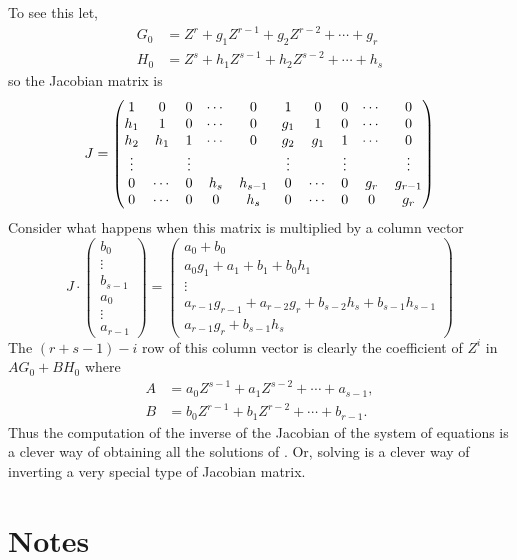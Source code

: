 To see this let,
\[
\begin{aligned}
  G_0 &= Z^r + g_1 Z^{r-1} + g_2 Z^{r-2} + \cdots + g_r\\
  H_0 &=Z^s + h_1 Z^{s-1} + h_2 Z^{s-2} + \cdots + h_s
\end{aligned}
\]
so the Jacobian matrix is
\[
J = 
\begin{pmatrix}
1&0&0& \cdots&0&1&0&0&\cdots&0\\
h_1&1&0& \cdots&0&g_1&1&0&\cdots&0\\
h_2&h_1&1& \cdots&0&g_2&g_1&1&\cdots&0\\
\vdots&\null&\vdots&\null&\null&\vdots&\null&\vdots&\null&\vdots\\
0&\cdots&0&h_s&h_{s-1}&0&\cdots&0&g_r&g_{r-1}\\
0&\cdots&0&0&h_s&0&\cdots&0&0&g_r
\end{pmatrix}
\]
Consider what happens when this matrix is multiplied by a column vector
\[
J\cdot
\begin{pmatrix}
b_0\\ \vdots \\ b_{s-1}\\ a_0\\ \vdots\\ a_{r-1}
\end{pmatrix}
=
\begin{pmatrix}
a_0 +b_0\\
a_0 g_1 + a_1 + b_1 + b_0 h_1\\
\vdots\\
a_{r-1} g_{r-1} + a_{r-2} g_r + b_{s-2} h_{s} + b_{s-1} h_{s-1}\\
a_{r-1} g_{r} + b_{s-1} h_{s}
\end{pmatrix}
\]
The $(r+ s - 1) - i$ row of this column vector is clearly the coefficient
of $Z^i$ in $A G_0 + B H_0$ where
\[
\begin{aligned}
  A &= a_0 Z^{s-1} + a_1 Z^{s-2} + \cdots + a_{s-1},\\
  B &= b_0 Z^{r-1} + b_1 Z^{r-2} + \cdots + b_{r-1}.
\end{aligned}
\]
Thus the computation of the inverse of the Jacobian of the system of
equations is a clever way of obtaining all the solutions of
.  Or, solving
 is a clever way of inverting a very special
type of Jacobian matrix.

\section*{Notes}

